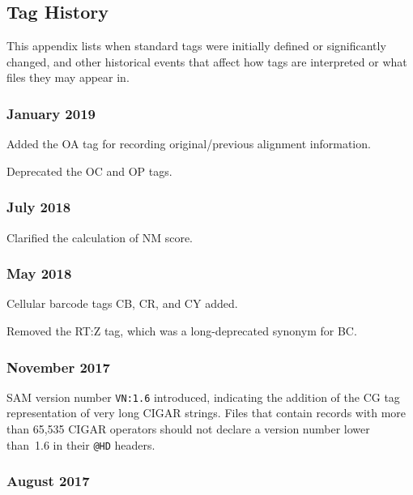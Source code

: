 \documentclass[10pt]{article}
\begin{document}
\begin{appendices}
\appendix
\section{Tag History}

This appendix lists when standard tags were initially defined or significantly changed, and other historical events that affect how tags are interpreted or what files they may appear in.

\setlength{\parindent}{0pt}
\newcommand*{\gap}{\vspace*{2ex}}

\subsubsection*{January 2019}
Added the OA tag for recording original/previous alignment information.

Deprecated the OC and OP tags.

\subsubsection*{July 2018}

Clarified the calculation of NM score.

\subsubsection*{May 2018}

Cellular barcode tags CB, CR, and CY added.

Removed the RT:Z tag, which was a long-deprecated synonym for BC.

\subsubsection*{November 2017}

SAM version number {\tt VN:1.6} introduced, indicating the addition of the CG tag representation of very long CIGAR strings.
Files that contain records with more than 65,535 CIGAR operators should not declare a version number lower than~1.6 in their {\tt @HD} headers.

\subsubsection*{August 2017}


\end{appendices}
\end{document}
